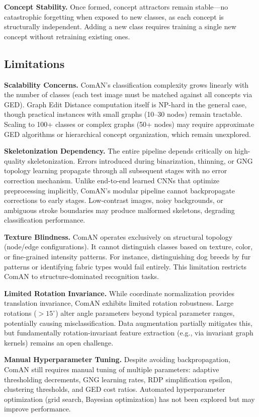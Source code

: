 \documentclass[12pt, a4paper]{article}
\begin{document}
\textbf{Concept Stability.} Once formed, concept attractors remain stable---no catastrophic forgetting when exposed to new classes, as each concept is structurally independent. Adding a new class requires training a single new concept without retraining existing ones.

\subsection{Limitations}

\textbf{Scalability Concerns.} ComAN's classification complexity grows linearly with the number of classes (each test image must be matched against all concepts via GED). Graph Edit Distance computation itself is NP-hard in the general case, though practical instances with small graphs (10--30 nodes) remain tractable. Scaling to 100+ classes or complex graphs (50+ nodes) may require approximate GED algorithms or hierarchical concept organization, which remain unexplored.

\textbf{Skeletonization Dependency.} The entire pipeline depends critically on high-quality skeletonization. Errors introduced during binarization, thinning, or GNG topology learning propagate through all subsequent stages with no error correction mechanism. Unlike end-to-end learned CNNs that optimize preprocessing implicitly, ComAN's modular pipeline cannot backpropagate corrections to early stages. Low-contrast images, noisy backgrounds, or ambiguous stroke boundaries may produce malformed skeletons, degrading classification performance.

\textbf{Texture Blindness.} ComAN operates exclusively on structural topology (node/edge configurations). It cannot distinguish classes based on texture, color, or fine-grained intensity patterns. For instance, distinguishing dog breeds by fur patterns or identifying fabric types would fail entirely. This limitation restricts ComAN to structure-dominated recognition tasks.

\textbf{Limited Rotation Invariance.} While coordinate normalization provides translation invariance, ComAN exhibits limited rotation robustness. Large rotations ($>15^\circ$) alter angle parameters beyond typical parameter ranges, potentially causing misclassification. Data augmentation partially mitigates this, but fundamentally rotation-invariant feature extraction (e.g., via invariant graph kernels) remains an open challenge.

\textbf{Manual Hyperparameter Tuning.} Despite avoiding backpropagation, ComAN still requires manual tuning of multiple parameters: adaptive thresholding decrements, GNG learning rates, RDP simplification epsilon, clustering thresholds, and GED cost ratios. Automated hyperparameter optimization (grid search, Bayesian optimization) has not been explored but may improve performance.
\end{document}
